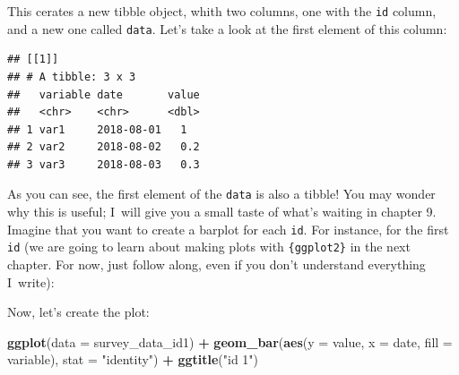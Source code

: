 \documentclass[]{gitbook}
\newenvironment{Shaded}{\begin{snugshade}}{\end{snugshade}}
\newcommand{\DataTypeTok}[1]{\textcolor[rgb]{0.13,0.29,0.53}{#1}}
\newcommand{\DecValTok}[1]{\textcolor[rgb]{0.00,0.00,0.81}{#1}}
\newcommand{\KeywordTok}[1]{\textcolor[rgb]{0.13,0.29,0.53}{\textbf{#1}}}
\newcommand{\NormalTok}[1]{#1}
\newcommand{\OperatorTok}[1]{\textcolor[rgb]{0.81,0.36,0.00}{\textbf{#1}}}
\newcommand{\StringTok}[1]{\textcolor[rgb]{0.31,0.60,0.02}{#1}}
\theoremstyle{definition}
\theoremstyle{definition}
\theoremstyle{definition}
\theoremstyle{remark}
\begin{document}
This cerates a new tibble object, whith two columns, one with the
\texttt{id} column, and a new one called \texttt{data}. Let's take a
look at the first element of this column:

\begin{Shaded}
\end{Shaded}

\begin{verbatim}
## [[1]]
## # A tibble: 3 x 3
##   variable date       value
##   <chr>    <chr>      <dbl>
## 1 var1     2018-08-01   1  
## 2 var2     2018-08-02   0.2
## 3 var3     2018-08-03   0.3
\end{verbatim}

As you can see, the first element of the \texttt{data} is also a tibble!
You may wonder why this is useful; I~will give you a small taste of
what's waiting in chapter 9. Imagine that you want to create a barplot
for each \texttt{id}. For instance, for the first \texttt{id} (we are
going to learn about making plots with \texttt{\{ggplot2\}} in the next
chapter. For now, just follow along, even if you don't understand
everything I~write):

\begin{Shaded}
\end{Shaded}

Now, let's create the plot:

\begin{Shaded}
\begin{Highlighting}[]
\KeywordTok{ggplot}\NormalTok{(}\DataTypeTok{data =}\NormalTok{ survey_data_id1) }\OperatorTok{+}
\StringTok{    }\KeywordTok{geom_bar}\NormalTok{(}\KeywordTok{aes}\NormalTok{(}\DataTypeTok{y =}\NormalTok{ value, }\DataTypeTok{x =}\NormalTok{ date, }\DataTypeTok{fill =}\NormalTok{ variable), }\DataTypeTok{stat =} \StringTok{"identity"}\NormalTok{) }\OperatorTok{+}
\StringTok{    }\KeywordTok{ggtitle}\NormalTok{(}\StringTok{"id 1"}\NormalTok{)}
\end{Highlighting}
\end{Shaded}
\end{document}
